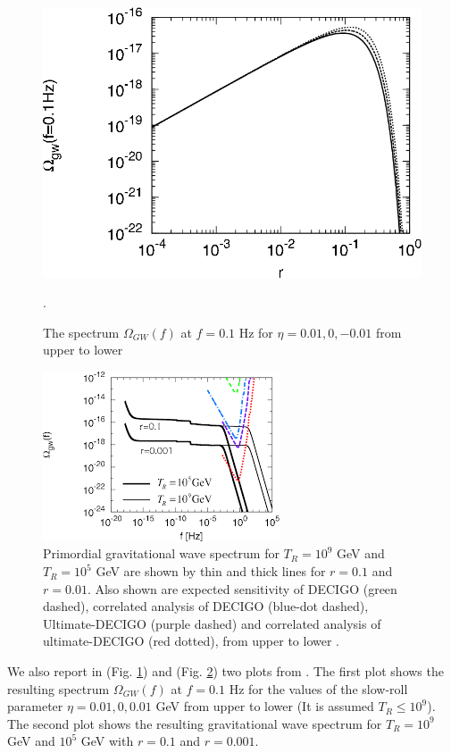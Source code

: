 \documentclass[11pt,a4paper,twoside]{book}
\begin{document}
\begin{figure}
	\centering
	\includegraphics[width=0.7\linewidth, height=0.3\textheight]{Images/Chap3/Nakayama_Saito_Fig2}
	\caption{The spectrum $\Omega_{GW}(f)$ at $ f=0.1 $ Hz for $ \eta=0.01,0,-0.01 $ from upper to lower \cite{Chap3:ProibingReheatingTemperature2008}}.
	\label{fig:nakayamasaitofig2}
\end{figure}
\begin{figure}
	\centering
	\includegraphics[width=0.7\linewidth, height=0.3\textheight]{Images/Chap3/Nakayama_Saito_Fig3}
	\caption{Primordial gravitational wave spectrum for $ T_{R}=10^{9}$ GeV and $ T_{R}=10^{5}$ GeV are shown by thin and thick lines for $ r=0.1 $ and $ r=0.01 $. Also shown are expected sensitivity of DECIGO (green dashed), correlated analysis of DECIGO (blue-dot dashed), Ultimate-DECIGO (purple dashed) and correlated analysis of ultimate-DECIGO (red dotted), from upper to lower \cite{Chap3:ProibingReheatingTemperature2008}. }
	\label{fig:nakayamasaitofig3}
\end{figure}
We also report in (Fig. \ref{fig:nakayamasaitofig2}) and (Fig. \ref{fig:nakayamasaitofig3}) two plots from \cite{Chap3:ProibingReheatingTemperature2008}. The first plot shows the resulting spectrum $\Omega_{GW}(f)$ at $ f=0.1 $ Hz for the values of the slow-roll parameter $\eta = 0.01, 0, 0.01$ GeV from upper to lower (It is assumed $ T_{R} \le  10^{9}$). The second plot shows the resulting gravitational wave spectrum for $ T_{R}=10^{9} $ GeV and $ 10^{5} $ GeV with $ r=0.1 $ and $ r=0.001 $. \\
\end{document}
